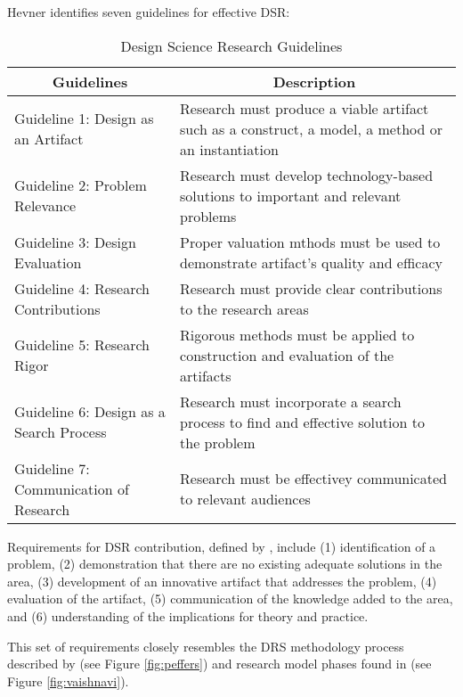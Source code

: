 Hevner \citeyearpar{Hevner2004} identifies seven guidelines for effective DSR:

\begin{table}[htb]
  \begin{center}
    \begin{tabular}{| l | p{6.5cm} |}
    \hline
     \multicolumn{1}{|c|}{\textbf{Guidelines}} &
     \multicolumn{1}{c|}{\textbf{Description}} \\
     \hline
     Guideline 1: Design as an Artifact & Research must produce a viable
    artifact such as a construct, a model, a method or an instantiation \\ \hline
     Guideline 2: Problem Relevance & Research must develop technology-based
     solutions to important and relevant problems \\ \hline 
     Guideline 3: Design Evaluation & Proper valuation mthods must be used to
     demonstrate artifact's quality and efficacy \\ \hline 
     Guideline 4: Research Contributions & Research must provide clear
     contributions to the research areas \\ \hline 
     Guideline 5: Research Rigor & Rigorous methods must be applied to
     construction and evaluation of the artifacts \\ \hline 
     Guideline 6: Design as a Search Process & Research must incorporate a
     search process to find and effective solution to the problem \\ \hline
     Guideline 7: Communication of Research & Research must be effectivey
     communicated to relevant audiences \\ \hline
    \end{tabular}
  \end{center}
  \caption{Design Science Research Guidelines \citep{Hevner2004}}
\end{table}

Requirements for DSR contribution, defined by \citet{March2008}, include (1)
identification of a problem, (2) demonstration that there are no existing
adequate solutions in the area, (3) development of an innovative artifact that
addresses the problem, (4) evaluation of the artifact, (5) communication of the
knowledge added to the area, and (6) understanding of the implications for
theory and practice.

This set of requirements closely resembles the DRS methodology process described
by \citet{Peffers2008} (see Figure \ref{fig:peffers}) and research model phases
found in \citet{Vaishnavi2007} (see Figure \ref{fig:vaishnavi}).

